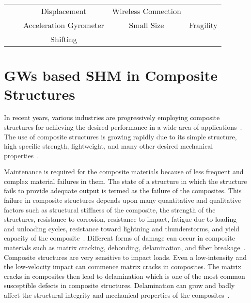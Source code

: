 \documentclass[b5paper, 11pt, titlepage]{book}
\begin{document}
\begin{table}[h]
\begin{adjustbox}{width=\textwidth = {!},center}
\begin{tabular}{ccccc}
	\multicolumn{1}{l}{}                                                                                                 &                              & Displacement                               & Wireless Connection                                                                  & \multicolumn{1}{l}{}                                              \\ \cline{3-5} 
	\multicolumn{1}{l}{}                                                                                                 &                              & \multicolumn{1}{l}{Acceleration Gyrometer} & Small Size                                                                           & Fragility                                                         \\ \cline{3-5} 
	\multicolumn{1}{l}{}                                                                                                 &                              & Shifting                                   & \multicolumn{1}{l}{}                                                                 & \multicolumn{1}{l}{}                                              \\ \hline
\end{tabular}
\end{adjustbox}
\end{table}

\section{GWs based SHM in Composite Structures}
In recent years, various industries are progressively employing composite structures for achieving the desired performance in a wide area of applications~\cite{Hameed2019b}. The use of composite structures is growing rapidly due to its simple structure, high specific strength, lightweight, and many other desired mechanical properties~\cite{Radzienski2019}. 

Maintenance is required for the composite materials because of less frequent and complex material failures in them. 
The state of a structure in which the structure fails to provide adequate output is termed as the failure of the composites. This failure in composite structures depends upon many quantitative and qualitative factors such as structural stiffness of the composite, the strength of the structures, resistance to corrosion, resistance to impact, fatigue due to loading and unloading cycles, resistance toward lightning and thunderstorms, and yield capacity of the composite~\cite{Rahul2018}. Different forms of damage can occur in composite materials such as matrix cracking, debonding, delamination, and fiber breakage~\cite{Yu2019,Fakih2019}. Composite structures are very sensitive to impact loads. Even a low-intensity and the low-velocity impact can commence matrix cracks in composites. The matrix cracks in composites then lead to delamination which is one of the most common susceptible defects in composite structures. Delamination can grow and badly affect the structural integrity and mechanical properties of the composites~\cite{Munian2018}. 
\end{document}
